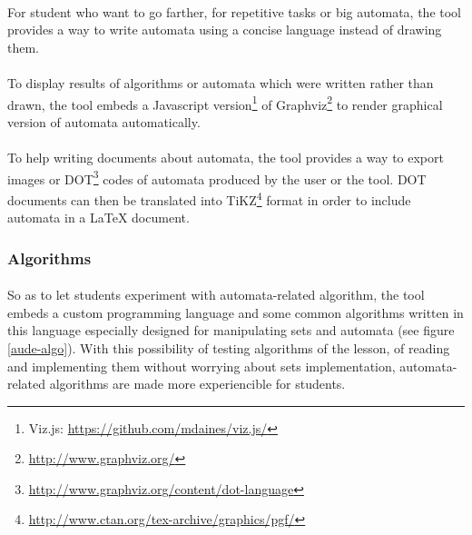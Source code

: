 \documentclass{article}
\begin{document}
\begin{sloppypar}
         
\paragraph{}
For student who want to go farther, for repetitive tasks or big automata, the tool provides a way to write automata using a concise language instead of drawing them.

         
\paragraph{}
To display results of algorithms or automata which were written rather than drawn, the tool embeds a Javascript version\footnote{Viz.js: \href{https://github.com/mdaines/viz.js/}{https://github.com/mdaines/viz.js/}} of Graphviz\footnote{\href{http://www.graphviz.org/}{http://www.graphviz.org/}} to render graphical version of automata automatically.

         
\paragraph{}
To help writing documents about automata, the tool provides a way to export images or DOT\footnote{\href{http://www.graphviz.org/content/dot-language}{http://www.graphviz.org/content/dot-language}} codes of automata produced by the user or the tool. DOT documents can then be translated into TiKZ\footnote{\href{http://www.ctan.org/tex-archive/graphics/pgf/}{http://www.ctan.org/tex-archive/graphics/pgf/}} format in order to include automata in a LaTeX document.
      
   
      

\subsubsection{ Algorithms}


\paragraph{}
So as to let students experiment with automata-related algorithm, the tool embeds a custom programming language and some common algorithms written in this language especially designed for manipulating sets and automata (see figure \ref{aude-algo}). With this possibility of testing algorithms of the lesson, of reading and implementing them without worrying about sets implementation, automata-related algorithms are made more experiencible for students.


\end{sloppypar}
\end{document}
